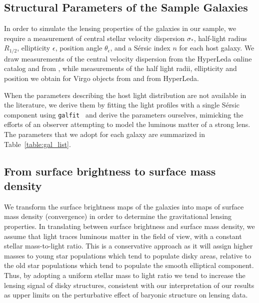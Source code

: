 \subsection{Structural Parameters of the Sample Galaxies}
\label{sect:lenses}

In order to simulate the lensing properties of the galaxies in our sample, we require a measurement of central stellar velocity dispersion $\sigma_*$, half-light radius $R_{1/2}$, ellipticity $\epsilon$, position angle $\theta_{\epsilon}$, and a S{\'e}rsic index $n$ for each host galaxy. We draw measurements of the central velocity dispersion from the HyperLeda online catalog \cite{Makarov++2014} and from \cite{Ma++2014}, while measurements of the half light radii, ellipticity and position we obtain for Virgo objects from \cite{Ferrarese++06} and from HyperLeda.

When the parameters describing the host light distribution are not available in the literature, we derive them by fitting the light profiles with a single S{\'e}rsic component using {\tt {galfit} } \cite{Peng++02} and derive the parameters ourselves, mimicking the efforts of an observer attempting to model the luminous matter of a strong lens. The parameters that we adopt for each galaxy are summarized in 
Table~\ref{table:gal_list}.

\subsection{From surface brightness to surface mass density}
\label{ssec:tomass}

We transform the surface brightness maps of the galaxies into maps of surface mass density (convergence) in order to determine the gravitational lensing properties. In translating between surface brightness and surface mass density, we assume that light traces luminous matter in the field of view, with a constant stellar mass-to-light ratio. This is a conservative approach as it will assign higher masses to young star populations which tend to populate disky areas, relative to the old star populations which tend to populate the smooth elliptical component. Thus, by adopting a uniform stellar mass to light ratio we tend to increase the lensing signal of disky structures, consistent with our interpretation of our results as upper limits on the perturbative effect of baryonic structure on lensing data. 

